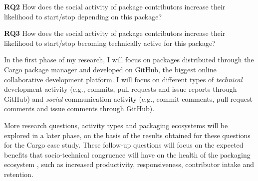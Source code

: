 \noindent \textbf{RQ2} How does the social activity of package contributors increase their likelihood to start/stop depending on this package?

\noindent \textbf{RQ3} How does the social activity of package contributors increase their likelihood to start/stop becoming technically active for this package?


In the first phase of my research, I will focus on packages distributed through the Cargo package manager and developed on GitHub, the biggest online collaborative development platform.
%
I will focus on different types of \emph{technical} development activity (e.g., commits, pull requests and issue reports through GitHub) and \emph{social} communication activity (e.g., commit comments, pull request comments and issue comments through GitHub). 

More research questions, activity types and packaging ecosystems will be explored in a later phase, on the basis of the results obtained for these questions for the Cargo case study. These follow-up questions will focus on the expected benefits that socio-technical congruence will have on the health of the packaging ecosystem
, such as increased productivity, responsiveness, contributor intake and retention.